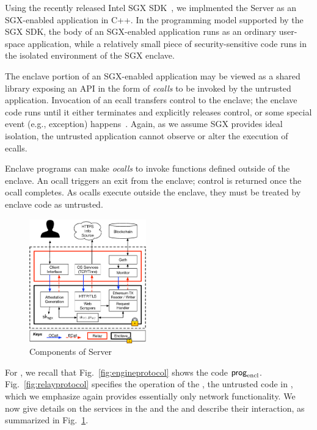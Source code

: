 

Using the recently released Intel SGX SDK~\cite{sgxsdk}, we implmented the \tc
Server as an SGX-enabled application in C++. In the programming model supported
by the SGX SDK, the body of an SGX-enabled application runs as an ordinary
user-space application, while a relatively small piece of security-sensitive
code runs in the isolated environment of the SGX enclave.

The enclave portion of an SGX-enabled application may be viewed as a shared
library exposing an API in the form of \emph{ecalls} to be invoked by the
untrusted application. Invocation of an ecall transfers control to the enclave;
the enclave code runs until it either terminates and explicitly releases
control, or some special event (e.g., exception) happens~\cite{sgxmanual}.
Again, as we assume SGX provides ideal isolation, the untrusted application
cannot observe or alter the execution of ecalls.

Enclave programs can make \emph{ocalls} to invoke functions defined outside of
the enclave. An ocall triggers an exit from the enclave; control is returned
once the ocall completes. As ocalls execute outside the enclave, they must be
treated by enclave code as untrusted. 

\begin{figure}[h]
    \centering
    \includegraphics[width=0.45\textwidth]{figures/impl}
    \caption{Components of \tc Server}
    \label{fig:tcserver_impl}
\end{figure}

For \tc, we recall that Fig.~\ref{fig:engineprotocol} shows the \encname code
${\sf prog}_{\textrm{encl}}$. Fig.~\ref{fig:relayprotocol} specifies the operation of the \medname,
the untrusted code in \tc, which we emphasize again provides essentially only
network functionality. We now give details on the services in the \encname and
the \medname and describe their interaction, as summarized in
Fig.~\ref{fig:tcserver_impl}.

